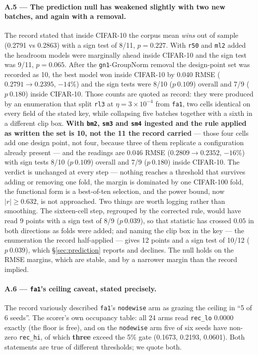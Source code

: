 \documentclass[10pt,letterpaper]{article}
\newcommand{\arm}[1]{\texttt{#1}}
\begin{document}
\paragraph{A.5 --- The prediction null has weakened slightly with two new batches, and again with a
removal.}
The record stated that inside CIFAR-10 the corpus mean \emph{wins} out of sample (0.2791 vs 0.2863)
with a sign test of 8/11, $p = 0.227$. With \arm{r50} and \arm{ml2} added the headroom models were
marginally ahead inside CIFAR-10 and the sign test was 9/11, $p = 0.065$. After the
\arm{gn1}-GroupNorm removal the design-point set was recorded as 10, the best model won inside
CIFAR-10 by 0.040 RMSE ($0.2791 \rightarrow 0.2395$, $-14\%$) and the sign tests were 8/10
($p\ 0.109$) overall and 7/9 ($p\ 0.180$) inside CIFAR-10. Those counts are quoted as record: they
were produced by an enumeration that split \arm{rl3} at $\eta = 3{\times}10^{-4}$ from \arm{fa1},
two cells identical on every field of the stated key, while collapsing five batches together with
a sixth in a different clip box. \textbf{With \arm{bm2}, \arm{sm3} and \arm{sm4} ingested and the
rule applied as written the set is 10, not the \textbf{11} the record carried} --- those four
cells add one design point, not four, because three of them replicate a configuration already
present --- and the readings are 0.046 RMSE ($0.2809 \rightarrow 0.2352$, $-16\%$) with sign tests
8/10 ($p\ 0.109$) overall and 7/9 ($p\ 0.180$) inside CIFAR-10. The verdict is unchanged at every
step --- nothing reaches a threshold that survives adding or removing one fold, the margin is
dominated by one CIFAR-100 fold, the functional form is a best-of-ten selection, and the power
bound, now $|r| \ge 0.632$, is not approached. Two things are worth logging rather than smoothing.
The sixteen-cell step, regrouped by the corrected rule, would have read 9 points with a sign test
of 8/9 ($p\ 0.039$), so that statistic has crossed $0.05$ in both directions as folds were added;
and naming the clip box in the key --- the enumeration the record half-applied --- gives 12 points
and a sign test of 10/12 ($p\ 0.039$), which \S\ref{sec:prediction} reports and declines. The null
holds on the RMSE margins, which are stable, and by a narrower margin than the record implied.

\paragraph{A.6 --- \arm{fa1}'s ceiling caveat, stated precisely.}
The record variously described \arm{fa1}'s \arm{nodewise} arm as grazing the ceiling in ``5 of 6
seeds''. The scorer's own occupancy table: all 24 arms read \texttt{rec\_lo} 0.0000 exactly (the
floor is free), and on the \arm{nodewise} arm five of six seeds have non-zero \texttt{rec\_hi}, of
which \textbf{three} exceed the 5\% gate (0.1673, 0.2193, 0.0601). Both statements are true of
different thresholds; we quote both.
\end{document}
